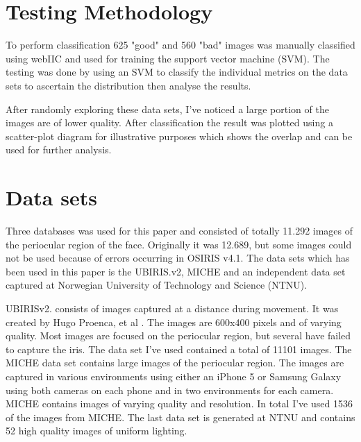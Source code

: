 
\section{Testing Methodology}\label{sec:test}
\vspace{-3mm}
To perform classification 625 "good" and 560 "bad" images was manually
classified using webIIC \cite{webiic} and used for training the support vector
machine (SVM). The testing was done by using an SVM to classify the individual
metrics on the data sets to ascertain the distribution then analyse the results.

After randomly exploring these data sets, I've noticed a large portion of the
images are of lower quality. After classification the result was plotted using a
scatter-plot diagram for illustrative purposes which shows the overlap and can
be used for further analysis.




\section{Data sets}\label{sec:dataset}
\vspace{-3mm}
Three databases was used for this paper and consisted of totally 11.292 images
of the periocular region of the face.  Originally it was 12.689, but some images
could not be used because of errors occurring in OSIRIS v4.1\cite{osiris}.
The data sets which has been used in this paper is the UBIRIS.v2\cite{ubiris},
MICHE\cite{miche} and an independent data set captured at Norwegian University of
Technology and Science (NTNU).

UBIRISv2. consists of images captured at a distance during movement. It was 
created by Hugo Proenca, et al \cite{ubiris}. The images are 600x400 pixels and
of varying quality. Most images are focused on the periocular region, but
several have failed to capture the iris.  The data set I've used contained a
total of 11101 images.
The MICHE\cite{miche} data set contains large images of the periocular region. 
The images are captured in various environments using either an iPhone 5 or 
Samsung Galaxy using both cameras on each phone and in two environments for each
camera. MICHE contains images of varying quality and resolution. In total I've
used 1536 of the images from MICHE.
The last data set is generated at NTNU and contains 52 high quality images of
uniform lighting.

